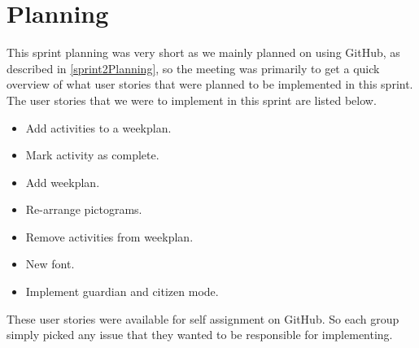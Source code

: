 \section{Planning}
This sprint planning was very short as we mainly planned on using GitHub, as described in \autoref{sprint2Planning}, so the meeting was primarily to get a quick overview of what user stories that were planned to be implemented in this sprint. 
The user stories that we were to implement in this sprint are listed below.

\begin{itemize}
\item Add activities to a weekplan.
\item Mark activity as complete.
\item Add weekplan.
\item Re-arrange pictograms.
\item Remove activities from weekplan.
\item New font.
\item Implement guardian and citizen mode.
\end{itemize}

These user stories were available for self assignment on GitHub.
So each group simply picked any issue that they wanted to be responsible for implementing.
